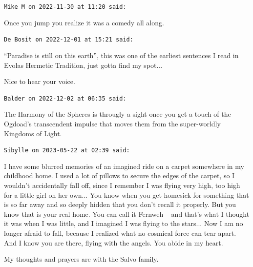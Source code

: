 \begin{footnotesize}
\begin{sffamily}
\texttt{Mike M on 2022-11-30 at 11:20 said:}

Once you jump you realize it was a comedy all along.

\hfill

\texttt{De Bosit on 2022-12-01 at 15:21 said:}

``Paradise is still on this earth'', this was one of the earliest sentences I read in Evolas Hermetic Tradition, just gotta find my spot... 

Nice to hear your voice.

\hfill

\texttt{Balder on 2022-12-02 at 06:35 said:}

The Harmony of the Spheres is througly a sight once you get a touch of the Ogdoad's transcendent impulse that moves them from the super-worldly Kingdoms of Light.

\hfill

\texttt{Sibylle on 2023-05-22 at 02:39 said:}

I have some blurred memories of an imagined ride on a carpet somewhere in my childhood home. I used a lot of pillows to secure the edges of the carpet, so I wouldn't accidentally fall off, since I remember I was flying very high, too high for a little girl on her own... You know when you get homesick for something that is so far away and so deeply hidden that you don't recall it properly. But you know that is your real home. You can call it Fernweh -- and that's what I thought it was when I was little, and I imagined I was flying to the stars... Now I am no longer afraid to fall, because I realized what no cosmical force can tear apart. And I know you are there, flying with the angels. You abide in my heart.

My thoughts and prayers are with the Salvo family.


\hfill

\end{sffamily}
\end{footnotesize}

